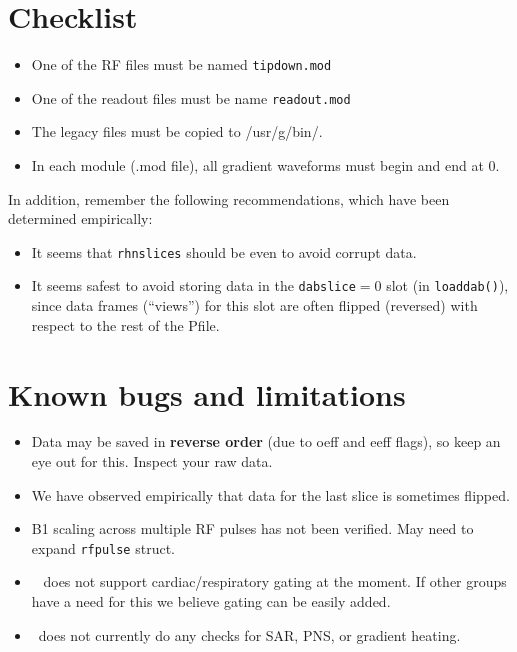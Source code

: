 \section{Checklist}

\begin{itemize}
	\item One of the RF files must be named {\tt tipdown.mod} 
	\item One of the readout files must be name {\tt readout.mod}
	\item The legacy files must be copied to /usr/g/bin/.
	\item In each module (.mod file), all gradient waveforms must begin and end at 0.
\end{itemize}

In addition, remember the following recommendations, which have been determined empirically:
\begin{itemize}
	\item It seems that {\tt rhnslices} should be even to avoid corrupt data.
	\item It seems safest to avoid storing data in the {\tt dabslice}$=$0 slot (in \texttt{loaddab()}), since data frames (``views'') for this slot are often flipped (reversed) with respect to the rest of the Pfile.
\end{itemize}


\section{Known bugs and limitations}
\begin{itemize}
	\item Data may be saved in \textbf{reverse order} (due to oeff and eeff flags), so keep an eye out for this. Inspect your raw data. %
	\item We have observed empirically that data for the last slice is sometimes flipped.
	\item B1 scaling across multiple RF pulses has not been verified. May need to expand \texttt{rfpulse} struct.
	\item \toppe~ does not support cardiac/respiratory gating at the moment. If other groups have a need for this we believe gating can be easily added.
	\item \toppe~does not currently do any checks for SAR, PNS, or gradient heating.
\end{itemize}

